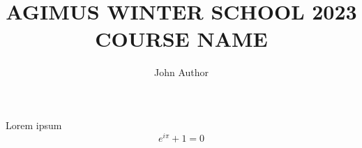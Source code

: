 \documentclass[
    xcolor={dvipsnames},
    aspectratio=169
]{beamer}
\title{%
    {\small AGIMUS WINTER SCHOOL 2023}\\
    \MakeUppercase{Course Name}
}
\author{John Author}
\institute{Institute}
\date{}
\begin{document}
\maketitle

\begin{frame}{Lorem ipsum}
    \lipsum[1]
    $$
        e^{i\pi} + 1 = 0
    $$
\end{frame}

\nocite{*}

\begin{frame}
    \printbibliography{}
\end{frame}
\end{document}
